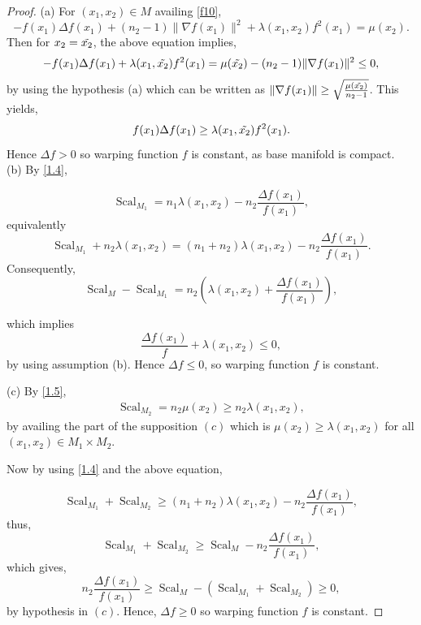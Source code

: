 \documentclass[10pt,a4paper]{amsart}
\begin{document}
\begin{proof}
	{(a)} For $(x_1, x_2) \in M$ availing \eqref{f10},
	\begin{equation*}
		-f(x_1)\Delta f(x_1) + (n_2-1)\|\nabla f(x_1)\|^2+ \lambda(x_1,x_2)f^2(x_1)=\mu (x_2). 
	\end{equation*}
Then for $x_2=\Tilde{x_2}$, the above equation implies,
     \begin{equation*}
     	-f(x_1)\Delta f(x_1) + \lambda(x_1,\Tilde{x_2})f^2(x_1)=\mu (\Tilde{x_2})-(n_2-1)\|\nabla f(x_1)\|^2\leq 0,
     \end{equation*} 
 by using the hypothesis (a) which can be written as $\|\nabla f(x_1)\|\geq \sqrt{\frac{\mu(\Tilde{x_2})}{n_2-1}}$. This yields,
 \begin{equation*}
 	f(x_1)\Delta f(x_1)\geq \lambda(x_1,\Tilde{x_2})f^2(x_1).
 \end{equation*}
 Hence $\Delta f>0$ so warping function $f$ is constant, as base manifold is compact. \\
 
 
 
 { (b)} By \eqref{1.4},
 
 	$$\operatorname{Scal}_{M_1}= n_1\lambda(x_1,x_2)-n_2\frac{\Delta f(x_1)}{f(x_1)},$$
  equivalently
 	$$ \operatorname{Scal}_{M_1}+n_2\lambda(x_1,x_2)=(n_1+n_2)\lambda(x_1,x_2)-n_2\frac{\Delta f(x_1)}{f(x_1)}.$$
Consequently,
 	$$\operatorname{Scal}_{M}-\operatorname{Scal}_{M_1}=n_2\left(\lambda(x_1,x_2)+\frac{\Delta f(x_1)}{f(x_1)}\right),$$
 
which implies
$$\dfrac{\Delta f(x_1)}{f}+ \lambda(x_1,x_2)\leq 0,$$ 
by using assumption (b).
Hence $\Delta f \leq 0$, so warping function $f$ is constant.\newline
 
 {(c)} By \eqref{1.5},
 \begin{align*}
 	\operatorname{Scal}_{M_2}=n_2\mu(x_2) \geq n_2 \lambda(x_1,x_2),
 \end{align*}
by availing the part of the supposition $(c)$ which is $\mu(x_2)\geq\lambda(x_1,x_2)$ for all $(x_1,x_2)\in M_1\times M_2$.
 
Now by using \eqref{1.4} and the above equation,

	$$\operatorname{Scal}_{M_1}+ \operatorname{Scal}_{M_2}\geq (n_1+n_2)\lambda(x_1,x_2)-n_2 \frac{\Delta f(x_1)}{f(x_1)},$$
 thus,
	$$\operatorname{Scal}_{M_1}+ \operatorname{Scal}_{M_2}\geq \operatorname{Scal}_M-n_2 \frac{\Delta f(x_1)}{f(x_1)},$$
 which gives,   
 $$n_2 \frac{\Delta f(x_1)}{f(x_1)}	\geq \operatorname{Scal}_M -(\operatorname{Scal}_{M_1}+\operatorname{Scal}_{M_2})\geq 0,$$
by hypothesis in $(c)$. 
Hence, $\Delta f\geq0$ so warping function $f$ is constant.\newline
 

\end{proof}
\end{document}
